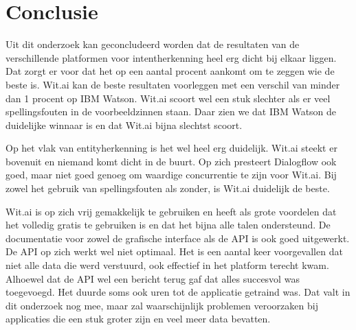 
\chapter{Conclusie}
\label{ch:conclusie}


Uit dit onderzoek kan geconcludeerd worden dat de resultaten van de verschillende platformen voor intentherkenning heel erg dicht bij elkaar liggen. Dat zorgt er voor dat het op een aantal procent aankomt om te zeggen wie de beste is. Wit.ai kan de beste resultaten voorleggen met een verschil van minder dan 1 procent op IBM Watson. Wit.ai scoort wel een stuk slechter als er veel spellingsfouten in de voorbeeldzinnen staan. Daar zien we dat IBM Watson de duidelijke winnaar is en dat Wit.ai bijna slechtst scoort.

Op het vlak van entityherkenning is het wel heel erg duidelijk. Wit.ai steekt er bovenuit en niemand komt dicht in de buurt. Op zich presteert Dialogflow ook goed, maar niet goed genoeg om waardige concurrentie te zijn voor Wit.ai. Bij zowel het gebruik van spellingsfouten als zonder, is Wit.ai duidelijk de beste.

Wit.ai is op zich vrij gemakkelijk te gebruiken en heeft als grote voordelen dat het volledig gratis te gebruiken is en dat het bijna alle talen ondersteund. De documentatie voor zowel de grafische interface als de API is ook goed uitgewerkt. De API op zich werkt wel niet optimaal. Het is een aantal keer voorgevallen dat niet alle data die werd verstuurd, ook effectief in het platform terecht kwam. Alhoewel dat de API wel een bericht terug gaf dat alles succesvol was toegevoegd. Het duurde soms ook uren tot de applicatie getraind was. Dat valt in dit onderzoek nog mee, maar zal waarschijnlijk problemen veroorzaken bij applicaties die een stuk groter zijn en veel meer data bevatten.

